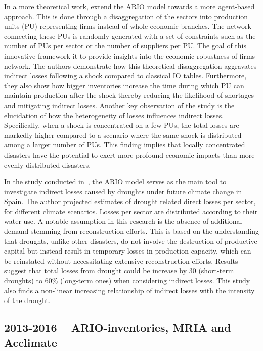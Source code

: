 In a more theoretical work, \textcite{henriet-2012-firm-networ}
extend the ARIO model towards a more agent-based approach. This is done through
a disaggregation of the sectors into production units (PU) representing firms
instead of whole economic branches. The network connecting these PUs
is randomly generated with a set of constraints such as the number of PUs per
sector or the number of suppliers per PU. The goal of this innovative framework
it to provide insights into the economic robustness of firms network.
The authors demonstrate how this theoretical disaggregation aggravates indirect
losses following a shock compared to classical IO tables. Furthermore, they also
show how bigger inventories increase the time during which PU can maintain
production after the shock thereby reducing the likelihood of shortages and
mitigating indirect losses. Another key observation of the study is the
elucidation of how the heterogeneity of losses influences indirect losses.
Specifically, when a shock is concentrated on a few PUs, the total losses are
markedly higher compared to a scenario where the same shock is distributed among
a larger number of PUs. This finding implies that locally concentrated disasters
have the potential to exert more profound economic impacts than more evenly
distributed disasters.

In the study conducted in~\textcite{jenkins-2013-indir-econom}, the ARIO
model serves as the main tool to investigate indirect losses caused by droughts
under future climate change in Spain. The author projected estimates of drought
related direct losses per sector, for different climate
scenarios. Losses per sector are distributed according to their water-use. A
notable assumption in this research is the absence of additional demand stemming
from reconstruction efforts. This is based on the understanding that
droughts, unlike other disasters, do not involve the destruction of productive
capital but instead result in temporary losses in production capacity, which
can be reinstated without necessitating extensive reconstruction efforts.
Results suggest that total losses from drought could be increase by 30
(short-term droughts) to 60\% (long-term ones) when considering indirect losses.
This study also finds a non-linear increasing relationship of indirect losses
with the intensity of the drought.

\subsection{2013-2016 -- ARIO-inventories, MRIA and Acclimate}

